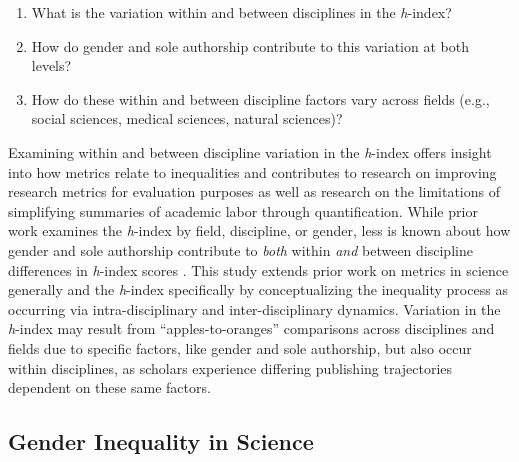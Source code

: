 \documentclass[
  10pt,
  letterpaper,
]{article}
\providecommand{\tightlist}{%
  \setlength{\itemsep}{0pt}\setlength{\parskip}{0pt}}\usepackage{longtable,booktabs,array}
\begin{document}
\begin{enumerate}
\def\labelenumi{\arabic{enumi}.}
\tightlist
\item
  What is the variation within and between disciplines in the
  \emph{h}-index?
\item
  How do gender and sole authorship contribute to this variation at both
  levels?
\item
  How do these within and between discipline factors vary across fields
  (e.g., social sciences, medical sciences, natural sciences)?
\end{enumerate}

Examining within and between discipline variation in the \emph{h}-index
offers insight into how metrics relate to inequalities and contributes
to research on improving research metrics for evaluation purposes as
well as research on the limitations of simplifying summaries of academic
labor through quantification. While prior work examines the
\emph{h}-index by field, discipline, or gender, less is known about how
gender and sole authorship contribute to \emph{both} within \emph{and}
between discipline differences in \emph{h}-index scores
\citep{bihari_review_2023}. This study extends prior work on metrics in
science generally and the \emph{h}-index specifically by conceptualizing
the inequality process as occurring via intra-disciplinary and
inter-disciplinary dynamics. Variation in the \emph{h}-index may result
from ``apples-to-oranges'' comparisons across disciplines and fields due
to specific factors, like gender and sole authorship, but also occur
within disciplines, as scholars experience differing publishing
trajectories dependent on these same factors.

\subsection{Gender Inequality in
Science}\label{gender-inequality-in-science}
\end{document}
